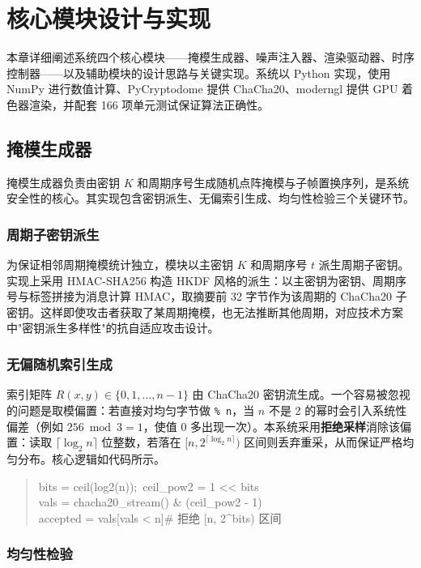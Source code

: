 \chapter{核心模块设计与实现}

本章详细阐述系统四个核心模块——掩模生成器、噪声注入器、渲染驱动器、时序控制器——以及辅助模块的设计思路与关键实现。系统以 Python 实现，使用 NumPy 进行数值计算、PyCryptodome 提供 ChaCha20、moderngl 提供 GPU 着色器渲染，并配套 166 项单元测试保证算法正确性。

\section{掩模生成器}

掩模生成器负责由密钥 $K$ 和周期序号生成随机点阵掩模与子帧置换序列，是系统安全性的核心。其实现包含密钥派生、无偏索引生成、均匀性检验三个关键环节。

\subsection{周期子密钥派生}

为保证相邻周期掩模统计独立，模块以主密钥 $K$ 和周期序号 $t$ 派生周期子密钥。实现上采用 HMAC-SHA256 构造 HKDF 风格的派生：以主密钥为密钥、周期序号与标签拼接为消息计算 HMAC，取摘要前 32 字节作为该周期的 ChaCha20 子密钥。这样即使攻击者获取了某周期掩模，也无法推断其他周期，对应技术方案中"密钥派生多样性"的抗自适应攻击设计。

\subsection{无偏随机索引生成}

索引矩阵 $R(x,y) \in \{0,1,\dots,n-1\}$ 由 ChaCha20 密钥流生成。一个容易被忽视的问题是取模偏置：若直接对均匀字节做 \verb|% n|，当 $n$ 不是 2 的幂时会引入系统性偏差（例如 $256 \bmod 3 = 1$，使值 0 多出现一次）。本系统采用\textbf{拒绝采样}消除该偏置：读取 $\lceil\log_2 n\rceil$ 位整数，若落在 $[n, 2^{\lceil\log_2 n\rceil})$ 区间则丢弃重采，从而保证严格均匀分布。核心逻辑如代码所示。

\begin{quote}\small\ttfamily
bits = ceil(log2(n));\ ceil\_pow2 = 1 << bits \\
vals = chacha20\_stream() \& (ceil\_pow2 - 1) \\
accepted = vals[vals < n]\quad\# 拒绝 [n, 2\^{}bits) 区间
\end{quote}

\subsection{均匀性检验}

